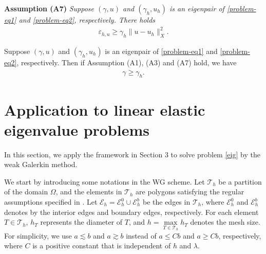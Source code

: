\documentclass[leqno,CJK]{siamltex704}
\numberwithin{equation}{section}
\def\E{{\mathcal{E}}}
\def\T{{\mathcal{T}}}
\begin{document}
	
	\textbf{Assumption (A7)}\emph{ Suppose $(\gamma,u)$ and $(\gamma_h,u_h)$ is an eigenpair of \eqref{problem-eq1} and \eqref{problem-eq2}, respectively. There holds
		\begin{eqnarray*}
			\varepsilon_{h,u} \ge \gamma_h\|u-u_h\|_X^2.
		\end{eqnarray*}
	}
	
	\begin{theorem}\label{thm-lower}
		Suppose $(\gamma,u)$ and $(\gamma_h,u_h)$ is an eigenpair of \eqref{problem-eq1} and \eqref{problem-eq2}, respectively. Then if Assumption (A1), (A3) and (A7) hold, we have
		\begin{eqnarray*}
			\gamma \ge \gamma_h.
		\end{eqnarray*}
	\end{theorem}
	

	
	
	
	
	
\section{Application to linear elastic eigenvalue problems}
In this section, we apply the framework in Section 3 to solve problem \eqref{eig} by the weak Galerkin method.

We start by introducing some notations in the WG scheme.
Let $\T_h$ be a partition of the domain $\Omega$, and the elements
in $\T_h$ are polygons satisfying the regular assumptions specified
in \cite{Wang2014a}. Let $\E_h=\E_h^0\cup\E_h^b$ be the edges in $\T_h$, where
$\E_h^0$ and $\E_h^b$ denotes by the interior edges and boundary edges, respectively. For each element $T\in\T_h$, $h_T$ represents the diameter of $T$, and $h=\max\limits_{T\in\T_h} h_T$ denotes the mesh size. For simplicity, we use $a\lesssim b$ and $a\gtrsim b$ instead of $a\le Cb$ and $a\ge Cb$, respectively, where $C$ is a positive constant that is independent of $h$ and $\lambda$.
\end{document}
